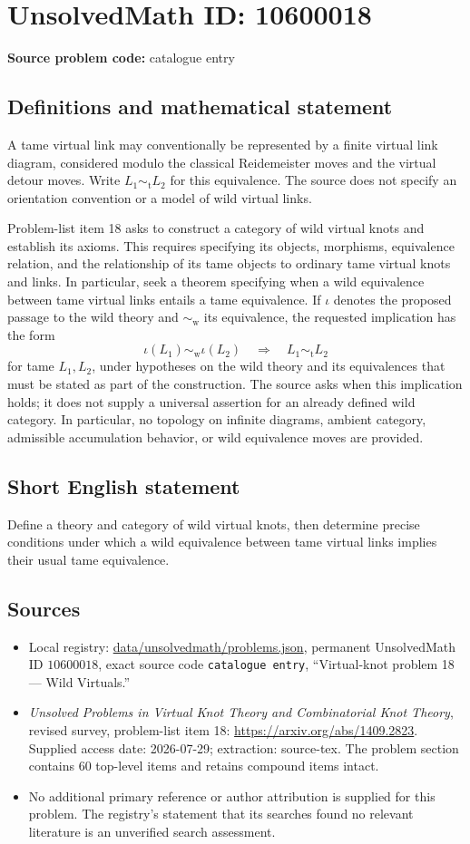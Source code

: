 \documentclass[11pt]{article}
\begin{document}
\section*{UnsolvedMath ID: 10600018}
\textbf{Source problem code:} catalogue entry
\subsection{Definitions and mathematical statement}
A tame virtual link may conventionally be represented by a finite virtual link diagram, considered modulo the classical Reidemeister moves and the virtual detour moves. Write $L_1\sim_{\mathrm t}L_2$ for this equivalence. The source does not specify an orientation convention or a model of wild virtual links.

Problem-list item 18 asks to construct a category of wild virtual knots and establish its axioms. This requires specifying its objects, morphisms, equivalence relation, and the relationship of its tame objects to ordinary tame virtual knots and links. In particular, seek a theorem specifying when a wild equivalence between tame virtual links entails a tame equivalence. If $\iota$ denotes the proposed passage to the wild theory and $\sim_{\mathrm w}$ its equivalence, the requested implication has the form
\[
 \iota(L_1)\sim_{\mathrm w}\iota(L_2)
 \quad\Longrightarrow\quad L_1\sim_{\mathrm t}L_2
\]
for tame $L_1,L_2$, under hypotheses on the wild theory and its equivalences that must be stated as part of the construction. The source asks when this implication holds; it does not supply a universal assertion for an already defined wild category. In particular, no topology on infinite diagrams, ambient category, admissible accumulation behavior, or wild equivalence moves are provided.
\subsection{Short English statement}
Define a theory and category of wild virtual knots, then determine precise conditions under which a wild equivalence between tame virtual links implies their usual tame equivalence.
\subsection{Sources}
\begin{itemize}
\item Local registry: \url{data/unsolvedmath/problems.json}, permanent UnsolvedMath ID $10600018$, exact source code \texttt{catalogue entry}, ``Virtual-knot problem 18 --- Wild Virtuals.''
\item \emph{Unsolved Problems in Virtual Knot Theory and Combinatorial Knot Theory}, revised survey, problem-list item 18: \url{https://arxiv.org/abs/1409.2823}. Supplied access date: 2026-07-29; extraction: source-tex. The problem section contains 60 top-level items and retains compound items intact.
\item No additional primary reference or author attribution is supplied for this problem. The registry's statement that its searches found no relevant literature is an unverified search assessment.
\end{itemize}
\end{document}
